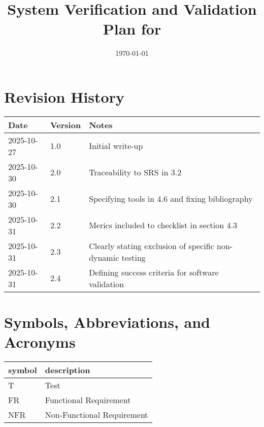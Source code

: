 \documentclass[12pt, titlepage]{article}
\begin{document}
\title{System Verification and Validation Plan for \progname{}} 
\author{\authname}
\date{\today}
	
\maketitle


\section*{Revision History}

\begin{tabularx}{\textwidth}{|p{3cm}|p{2cm}|X|}
\hline
{\bf Date} & {\bf Version} & {\bf Notes}\\
\hline
2025-10-27 & 1.0 & Initial write-up\\
2025-10-30 & 2.0 & Traceability to SRS in 3.2 \\
2025-10-30 & 2.1 & Specifying tools in 4.6 and fixing bibliography \\
2025-10-31 & 2.2 & Merics included to checklist in section 4.3 \\
2025-10-31 & 2.3 & Clearly stating exclusion of specific non-dynamic testing \\
2025-10-31 & 2.4 & Defining success criteria for software validation \\
\hline
\end{tabularx}

\newpage

\tableofcontents


\newpage

\section{Symbols, Abbreviations, and Acronyms}

\renewcommand{\arraystretch}{1.2}
\begin{tabular}{|l|l|} 
  \hline	
  \textbf{symbol} & \textbf{description}\\
  \hline
  T & Test\\
  FR & Functional Requirement\\
  NFR & Non-Functional Requirement\\
  \hline
\end{tabular}\\


\newpage

\end{document}
